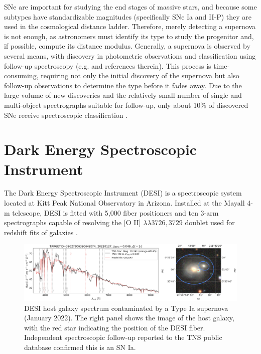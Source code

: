 SNe are important for studying the end stages of massive stars, and because some subtypes have standardizable magnitudes (specifically SNe Ia and II-P) they are used in the cosmological distance ladder. Therefore, merely detecting a supernova is not enough, as astronomers must identify its
type to study the progenitor and, if possible, compute its distance modulus. Generally, a supernova is observed by several 
means, with discovery in photometric observations and classification using follow-up 
spectroscopy (e.g. \textcite{Perlmutter1999} and references therein). This process is time-consuming, requiring not only 
the initial discovery of the supernova but also follow-up observations to determine
the type before it fades away. Due to the large volume of new discoveries and 
the relatively small number of single and multi-object spectrographs suitable for follow-up, only 
about 10\% of discovered SNe receive spectroscopic classification \parencite{TNS}. 

\section{Dark Energy Spectroscopic Instrument}
\label{sec:DESI}
The Dark Energy Spectroscopic Instrument (DESI) is a spectroscopic system located at Kitt Peak National Observatory
in Arizona. Installed at the Mayall 4-m telescope, DESI is fitted with 5,000 fiber positioners and ten 3-arm 
spectrographs capable of resolving the [O II] $\lambda \lambda3726,3729$ doublet used for redshift fits of galaxies \parencite{Guy2023}. 
%
%
%
\begin{figure}[t]
    \centering
    \includegraphics[width=\textwidth]{figures/desi_figures/SNe_Detection.png}
    \caption[Publicly Classified SNe captured by DESI]{DESI host galaxy spectrum contaminated by a Type Ia supernova (January 2022). The right panel shows the image of the host galaxy, with the red star indicating the position of the DESI fiber. Independent spectroscopic follow-up reported to the TNS public database confirmed this is an SN Ia.}
    \label{fig:desi_supernova}
\end{figure}

